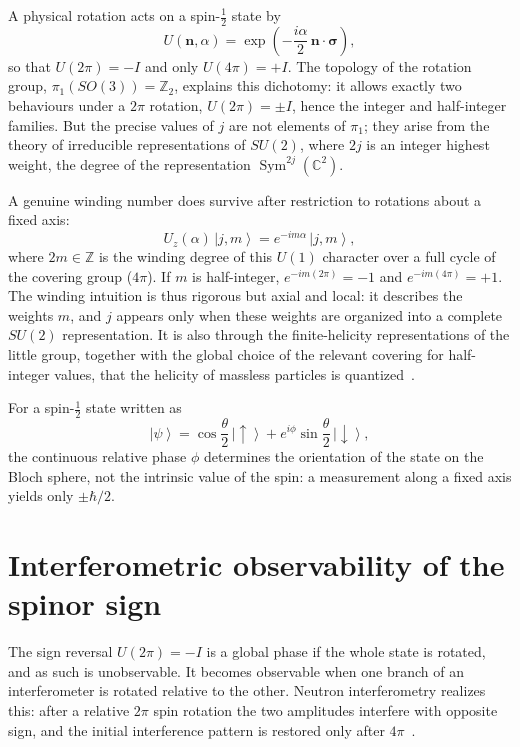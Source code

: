 \documentclass[11pt,a4paper]{article}
\newcommand{\ket}[1]{\left|#1\right\rangle}
\begin{document}
A physical rotation acts on a spin-$\tfrac12$ state by
\begin{equation}
U(\mathbf{n}, \alpha) = \exp\!\left(-\frac{i\alpha}{2}\, \mathbf{n} \cdot \boldsymbol{\sigma}\right),
\label{eq:su2rotation}
\end{equation}
so that $U(2\pi) = -I$ and only $U(4\pi) = +I$.
The topology of the rotation group, $\pi_1(SO(3)) = \mathbb{Z}_2$, explains this dichotomy: it allows
exactly two behaviours under a $2\pi$ rotation, $U(2\pi) = \pm I$, hence the integer and half-integer
families.
But the precise values of $j$ are not elements of $\pi_1$; they arise from the theory of irreducible
representations of $SU(2)$, where $2j$ is an integer highest weight, the degree of the representation
$\operatorname{Sym}^{2j}(\mathbb{C}^2)$.

A genuine winding number does survive after restriction to rotations about a fixed axis:
\begin{equation}
U_z(\alpha)\, \ket{j, m} = e^{-i m \alpha}\, \ket{j, m},
\label{eq:weight}
\end{equation}
where $2m \in \mathbb{Z}$ is the winding degree of this $U(1)$ character over a full cycle of the covering
group ($4\pi$).
If $m$ is half-integer, $e^{-i m (2\pi)} = -1$ and $e^{-i m (4\pi)} = +1$.
The winding intuition is thus rigorous but axial and local: it describes the weights $m$, and $j$ appears
only when these weights are organized into a complete $SU(2)$ representation.
It is also through the finite-helicity representations of the little group, together with the global choice
of the relevant covering for half-integer values, that the helicity of massless particles is
quantized~\cite{Wigner1939}.

For a spin-$\tfrac12$ state written as
\begin{equation}
\ket{\psi} = \cos\frac{\theta}{2}\, \ket{\uparrow} + e^{i\phi} \sin\frac{\theta}{2}\, \ket{\downarrow},
\label{eq:bloch}
\end{equation}
the continuous relative phase $\phi$ determines the orientation of the state on the Bloch sphere, not the
intrinsic value of the spin: a measurement along a fixed axis yields only $\pm\hbar/2$.

\section{Interferometric observability of the spinor sign}
\label{sec:interferometry}

The sign reversal $U(2\pi) = -I$ is a global phase if the whole state is rotated, and as such is
unobservable.
It becomes observable when one branch of an interferometer is rotated relative to the other.
Neutron interferometry realizes this: after a relative $2\pi$ spin rotation the two amplitudes interfere
with opposite sign, and the initial interference pattern is restored only after
$4\pi$~\cite{Rauch1975, Werner1975}.
\end{document}
